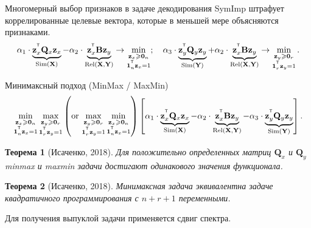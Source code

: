 \documentclass[9pt]{beamer}
\renewcommand{\geq}{\ensuremath{\geqslant}}
\newcommand{\bz}{\mathbf{z}}
\newcommand{\bB}{\mathbf{B}}
\newcommand{\bQ}{\mathbf{Q}}
\newcommand{\bX}{\mathbf{X}}
\newcommand{\bY}{\mathbf{Y}}
\newcommand{\T}{^{\text{\tiny\sffamily\upshape\mdseries T}}}
\newcommand{\bOne}{\boldsymbol{1}}
\newcommand{\bZero}{\boldsymbol{0}}
\newtheorem{rustheorem}{Теорема}
\begin{document}
\begin{frame}{Многомерный выбор признаков в задаче декодирования}
	SymImp штрафует коррелированные целевые вектора, которые в меньшей мере объясняются признаками. 
	\[
	\alpha_1 \cdot \underbrace{\bz_x^{\T} \bQ_x \bz_x}_{\text{Sim}(\bX)} - \alpha_2 \cdot \underbrace{\vphantom{()} \bz_x^{\T}\mathbf{B} \bz_y}_{\text{Rel}(\bX, \bY)} \rightarrow \min_{\substack{\bz_x \geq \bZero_n \\ \bOne_n^{\T}\bz_x=1}}; \quad
	\alpha_3 \cdot \underbrace{\bz_y^{\T} \bQ_y \bz_y}_{\text{Sim}(\bY)} + \alpha_2 \cdot \underbrace{\vphantom{()} \bz_x^{\T} \mathbf{B} \bz_y}_{\text{Rel}(\bX, \bY)} \rightarrow \min_{\substack{\bz_y \geq \bZero_r  \\ \bOne_r^{\T}\bz_y=1}}.
	\]
	\vspace{-0.2cm}
	\begin{block}{Минимаксный подход (MinMax / MaxMin)}
	\vspace{-0.5cm}
	\[
	\min_{\substack{\bz_x \geq \bZero_n \\ \bOne_n^{\T}\bz_x=1}} 	\max_{\substack{\bz_y \geq \bZero_r \\ \bOne_r^{\T}\bz_y=1}} \left(\text {or} \, \max_{\substack{\bz_y \geq \bZero_r \\ \bOne_r^{\T}\bz_y=1}} \min_{\substack{\bz_x \geq \bZero_n \\ \bOne_n^{\T}\bz_x=1}}\right) \left[\alpha_1 \cdot \underbrace{\bz_x^{\T} \bQ_x \bz_x}_{\text{Sim}(\bX)} - \alpha_2 \cdot \underbrace{\bz_x^{\T} \bB \bz_y}_{\text{Rel}(\bX, \bY)} - \alpha_3 \cdot \underbrace{\bz_y^{\T} \bQ_y \bz_y}_{\text{Sim}(\bY)}\right].
	\]
	\end{block}
	\vspace{-0.4cm}
	\begin{rustheorem}[Исаченко, 2018]
		Для положительно определенных матриц $\bQ_x$ и $\bQ_y$ minmax и maxmin задачи достигают одинакового значения функционала.
	\end{rustheorem}
	\vspace{-0.2cm}
	\begin{rustheorem}[Исаченко, 2018]
		Минимаксная задача эквивалентна задаче квадратичного программирования с $n + r + 1$ переменными.
	\end{rustheorem}
	Для получения выпуклой задачи применяется сдвиг спектра.

\end{frame}
\end{document}
